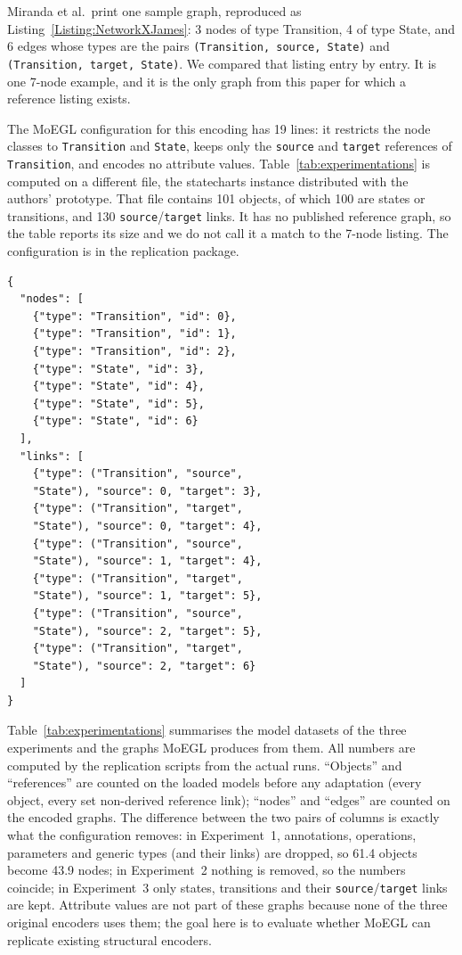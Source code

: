 \documentclass[journal,article,submit,moreauthors,technologies]{Definitions/mdpi}
\newcommand{\rev}[1]{#1}
\begin{document}
\rev{Miranda et al.\ print one sample graph, reproduced as Listing~\ref{Listing:NetworkXJames}: 3 nodes of type Transition, 4 of type State, and 6 edges whose types are the pairs \texttt{(Transition, source, State)} and \texttt{(Transition, target, State)}. We compared that listing entry by entry. It is one 7-node example, and it is the only graph from this paper for which a reference listing exists.}

\rev{The MoEGL configuration for this encoding has 19 lines: it restricts the node classes to \texttt{Transition} and \texttt{State}, keeps only the \texttt{source} and \texttt{target} references of \texttt{Transition}, and encodes no attribute values. Table~\ref{tab:experimentations} is computed on a different file, the statecharts instance distributed with the authors' prototype. That file contains 101 objects, of which 100 are states or transitions, and 130 \texttt{source}/\texttt{target} links. It has no published reference graph, so the table reports its size and we do not call it a match to the 7-node listing. The configuration is in the replication package.}


\begin{program_}[H]
\footnotesize
\begin{verbatim}
{
  "nodes": [
    {"type": "Transition", "id": 0},
    {"type": "Transition", "id": 1},
    {"type": "Transition", "id": 2},
    {"type": "State", "id": 3},
    {"type": "State", "id": 4},
    {"type": "State", "id": 5},
    {"type": "State", "id": 6}
  ],
  "links": [
    {"type": ("Transition", "source",
    "State"), "source": 0, "target": 3},
    {"type": ("Transition", "target",
    "State"), "source": 0, "target": 4},
    {"type": ("Transition", "source",
    "State"), "source": 1, "target": 4},
    {"type": ("Transition", "target",
    "State"), "source": 1, "target": 5},
    {"type": ("Transition", "source",
    "State"), "source": 2, "target": 5},
    {"type": ("Transition", "target",
    "State"), "source": 2, "target": 6}
  ]
}
\end{verbatim}
\caption{The graph data of the FSM instance model in~\cite{miranda2024towards}.}
\label{Listing:NetworkXJames}
\end{program_}



\rev{Table~\ref{tab:experimentations} summarises the model datasets of the three experiments and the graphs MoEGL produces from them. All numbers are computed by the replication scripts from the actual runs. ``Objects'' and ``references'' are counted on the loaded models before any adaptation (every object, every set non-derived reference link); ``nodes'' and ``edges'' are counted on the encoded graphs. The difference between the two pairs of columns is exactly what the configuration removes: in Experiment~1, annotations, operations, parameters and generic types (and their links) are dropped, so 61.4 objects become 43.9 nodes; in Experiment~2 nothing is removed, so the numbers coincide; in Experiment~3 only states, transitions and their \texttt{source}/\texttt{target} links are kept. Attribute values are not part of these graphs because none of the three original encoders uses them; the goal here is to evaluate whether MoEGL can replicate existing structural encoders.}
\end{document}
